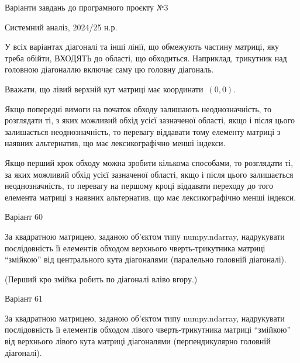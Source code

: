 \documentclass[11pt, ukrainian]{article}
\begin{document}
{\Large \center  Варіанти завдань до програмного проєкту №3\par Системний аналіз, 2024/25 н.р.\par \bigskip\bigskip}

\vspace{2mm}
У всіх варіантах діагоналі та інші лінії, що обмежують частину матриці, яку треба обійти, ВХОДЯТЬ до області, що обходиться. Наприклад, трикутник над головною діагоналлю включає саму цю головну діагональ.

\vspace{2mm}

Вважати, що лівий верхній кут матриці має координати~$(0,0)$.

\vspace{2mm}

Якщо попередні вимоги на початок обходу залишають неоднозначність, то розглядати ті, з яких можливий обхід усієї зазначеної області, якщо і після цього залишається неоднозначність, то перевагу віддавати тому елементу матриці з наявних альтернатив, що має лексикографічно менші індекси.

\vspace{2mm}

Якщо перший крок обходу можна зробити кількома способами, то розглядати ті, за яких можливий обхід усієї зазначеної області, якщо і після цього залишається неоднозначність, то перевагу на першому кроці віддавати переходу до того елемента матриці з наявних альтернатив, що має лексикографічно менші індекси.

\vspace{2mm}

{\Large \center  Варіант  60\par \bigskip\bigskip}

За квадратною матрицею, заданою об'єктом типу numpy.ndarray, надрукувати послідовність її елементів обходом верхнього чверть-трикутника матриці ``змійкою'' від центрального кута діагоналями (паралельно головній діагоналі).


(Перший кро змійка робить по діагоналі вліво вгору.)


{\Large \center  Варіант  61\par \bigskip\bigskip}

За квадратною матрицею, заданою об'єктом типу numpy.ndarray, надрукувати послідовність її елементів обходом лівого чверть-трикутника матриці ``змійкою'' від верхнього лівого кута матриці діагоналями (перпендикулярно головній діагоналі).
\end{document}
